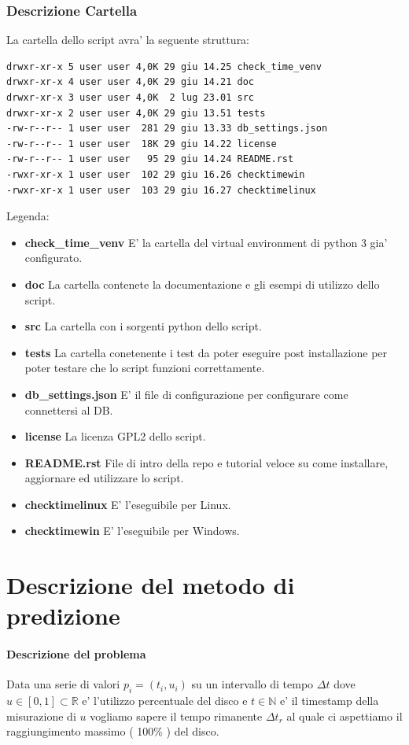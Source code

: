 \documentclass{article}
\begin{document}
\section*{Descrizione Cartella}
La cartella dello script avra' la seguente struttura:
\begin{lstlisting}[language=Bash]
drwxr-xr-x 5 user user 4,0K 29 giu 14.25 check_time_venv
drwxr-xr-x 4 user user 4,0K 29 giu 14.21 doc
drwxr-xr-x 3 user user 4,0K  2 lug 23.01 src
drwxr-xr-x 2 user user 4,0K 29 giu 13.51 tests
-rw-r--r-- 1 user user  281 29 giu 13.33 db_settings.json
-rw-r--r-- 1 user user  18K 29 giu 14.22 license
-rw-r--r-- 1 user user   95 29 giu 14.24 README.rst
-rwxr-xr-x 1 user user  102 29 giu 16.26 checktimewin
-rwxr-xr-x 1 user user  103 29 giu 16.27 checktimelinux
\end{lstlisting}

Legenda:
\begin{itemize}
    \item \textbf{check\_time\_venv} E' la cartella del virtual environment di python 3 gia' configurato.
    \item \textbf{doc} La cartella contenete la documentazione e gli esempi di utilizzo dello script.
    \item \textbf{src} La cartella con i sorgenti python dello script.
    \item \textbf{tests} La cartella conetenente i test da poter eseguire post installazione per poter testare che lo script funzioni correttamente.
    \item \textbf{db\_settings.json} E' il file di configurazione per configurare come connettersi al DB.
    \item \textbf{license} La licenza GPL2 dello script.
    \item \textbf{README.rst} File di intro della repo e tutorial veloce su come installare, aggiornare ed utilizzare lo script.
    \item \textbf{checktimelinux} E' l'eseguibile per Linux.
    \item \textbf{checktimewin} E' l'eseguibile per Windows.
\end{itemize}

\clearpage
\part*{Descrizione del metodo di predizione}

\subsection{Descrizione del problema}
Data una serie di valori \(p_i = (t_i, u_i)\) su un intervallo di tempo \(\Delta t\) dove \(u \in [0, 1] \subset \mathbb{R}\) e' l'utilizzo percentuale del  disco e \(t \in \mathbb{N}\) e' il timestamp  della misurazione di \(u\) vogliamo sapere il tempo rimanente \(\Delta t_r\) al quale ci aspettiamo il raggiungimento massimo ( 100\% ) del disco. 
\end{document}
